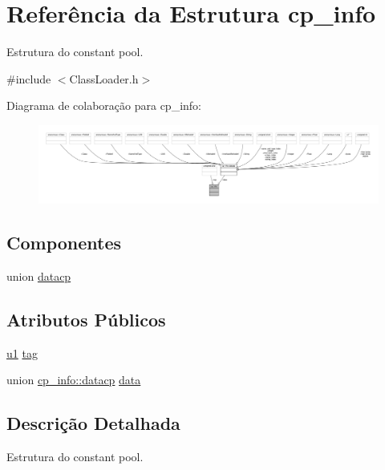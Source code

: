 \hypertarget{structcp__info}{}\section{Referência da Estrutura cp\+\_\+info}
\label{structcp__info}


Estrutura do constant pool.  




{\ttfamily \#include $<$Class\+Loader.\+h$>$}



Diagrama de colaboração para cp\+\_\+info\+:\nopagebreak
\begin{figure}[H]
\begin{center}
\leavevmode
\includegraphics[width=350pt]{structcp__info__coll__graph}
\end{center}
\end{figure}
\subsection*{Componentes}
\begin{DoxyCompactItemize}
\item 
union \hyperlink{unioncp__info_1_1datacp}{datacp}
\end{DoxyCompactItemize}
\subsection*{Atributos Públicos}
\begin{DoxyCompactItemize}
\item 
\hyperlink{ClassLoader_8h_a216a9f8b04b4f0af84a4ca9d1d85a6ca}{u1} \hyperlink{structcp__info_a045b8801a6e96a2a31d3b62ea684f141}{tag}
\item 
union \hyperlink{unioncp__info_1_1datacp}{cp\+\_\+info\+::datacp} \hyperlink{structcp__info_a1c63f47410d9a935cfe2ce56075957cb}{data}
\end{DoxyCompactItemize}


\subsection{Descrição Detalhada}
Estrutura do constant pool. 

